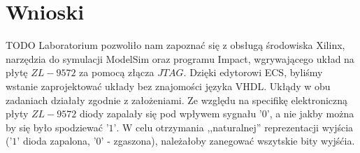 \documentclass[wide,a4paper,titlepage,12pt] {article}
\begin{document}
  \paragraph{}
  \newpage
  \section{Wnioski}
  TODO
  Laboratorium pozwoliło nam zapoznać się z obsługą środowiska Xilinx, narzędzia do symulacji ModelSim oraz programu Impact, wgrywającego układ na płytę $ZL-9572$ za pomocą złącza $JTAG$. Dzięki edytorowi ECS, byliśmy wstanie zaprojektować układy bez znajomości języka VHDL. Ukłądy w obu zadaniach działały zgodnie z założeniami. Ze względu na specifikę elektroniczną płyty $ZL-9572$ diody zapalały się pod wpływem sygnału $\mbox{'}0\mbox{'}$, a nie jakby można by się było spodziewać $\mbox{'}1\mbox{'}$. W celu otrzymania ,,naturalnej'' reprezentacji wyjścia ($\mbox{'}1\mbox{'}$ dioda zapalona, $\mbox{'}0\mbox{'}$ - zgaszona), należałoby zanegować wszytskie bity wyjśćia.
\end{document}
